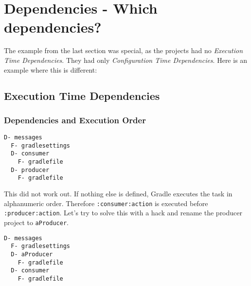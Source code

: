 \section{Dependencies - Which dependencies?} %
\label{sec:dependencies_which_dependencies_}
The example from the last section was special, as the projects had no \emph{Execution Time Dependencies}. They had only \emph{Configuration Time Dependencies}. Here is an example where this is different:

\subsection{Execution Time Dependencies} %
\label{sub:execution_time_dependencies}

\subsubsection{Dependencies and Execution Order} %
\label{ssub:dependencies_and_execution_order}

\begin{minipage}[t]{7cm}
\begin{Verbatim}[frame=single,label=Project Tree]
D- messages
  F- gradlesettings
  D- consumer
    F- gradlefile
  D- producer
    F- gradlefile	
\end{Verbatim}
\end{minipage}	
\begin{minipage}[t]{9cm}
\end{minipage}

This did not work out. If nothing else is defined, Gradle executes the task in alphanumeric order. Therefore \texttt{:consumer:action} is executed before \texttt{:producer:action}. Let's try to solve this with a hack and rename the producer project to \texttt{aProducer}.

\begin{minipage}[t]{7cm}
\begin{Verbatim}[frame=single,label=Project Tree]
D- messages
  F- gradlesettings
  D- aProducer
    F- gradlefile
  D- consumer
    F- gradlefile	
\end{Verbatim}
\end{minipage}	
\begin{minipage}[t]{9cm}
\end{minipage}

